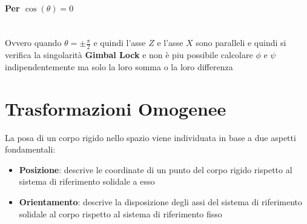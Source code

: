 \documentclass[11pt, a4paper]{report}
\begin{document}
\paragraph{Per $\cos(\theta) = 0$}\mbox{}\\
Ovvero quando $\theta = \pm \frac{\pi}{2}$ e quindi l'asse $Z$ e l'asse $X$ sono paralleli e quindi si verifica la singolarità \textbf{Gimbal Lock} e non è piu possibile calcolare $\phi$ e $\psi$ indipendentemente ma solo la loro somma o la loro differenza
\newpage
\section{Trasformazioni Omogenee}
La posa di un corpo rigido nello spazio viene individuata in base a due aspetti fondamentali:
\begin{itemize}
    \item \textbf{Posizione}: descrive le coordinate di un punto del corpo rigido rispetto al sistema di riferimento solidale a esso
    \item \textbf{Orientamento}: descrive la disposizione degli assi del sistema di riferimento solidale al corpo rispetto al sistema di riferimento fisso
\end{itemize}
\end{document}
